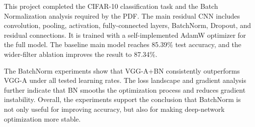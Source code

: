 \documentclass[12pt]{article}
\begin{document}
This project completed the CIFAR-10 classification task and the Batch Normalization analysis required by the PDF. The main residual CNN includes convolution, pooling, activation, fully-connected layers, BatchNorm, Dropout, and residual connections. It is trained with a self-implemented AdamW optimizer for the full model. The baseline main model reaches 85.39\% test accuracy, and the wider-filter ablation improves the result to 87.34\%.

The BatchNorm experiments show that VGG-A+BN consistently outperforms VGG-A under all tested learning rates. The loss landscape and gradient analysis further indicate that BN smooths the optimization process and reduces gradient instability. Overall, the experiments support the conclusion that BatchNorm is not only useful for improving accuracy, but also for making deep-network optimization more stable.
\end{document}
